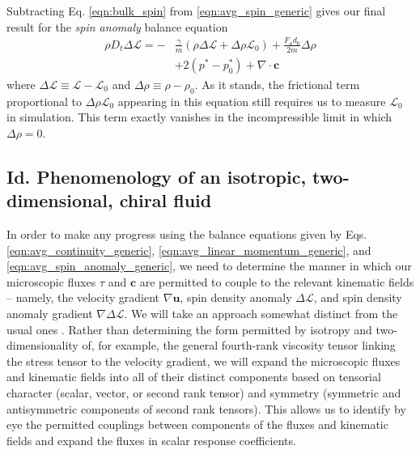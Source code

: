 \documentclass[%
 reprint,
superscriptaddress,
longbibliography,
 amsmath,amssymb,
 prl,
 citeautoscript,
]{revtex4-1}
\begin{document}
Subtracting Eq. \ref{eqn:bulk_spin} from \ref{eqn:avg_spin_generic} gives our final result for the {\it spin anomaly} balance equation
\begin{equation}
\begin{split}
\rho D_t \Delta \mathcal{L} = - &\frac{\gamma}{m} \left( \rho \Delta \mathcal{L} + \Delta \rho \mathcal{L}_0 \right) + \frac{F_a d_0}{2 m} \Delta \rho \\
&+ 2 \left( p^* - p^*_0 \right) + \nabla \cdot {\boldsymbol c}
\end{split}
\label{eqn:avg_spin_anomaly_generic}
\end{equation}
where $\Delta \mathcal{L} \equiv \mathcal{L} - \mathcal{L}_0$ and $\Delta \rho \equiv \rho - \rho_0$. As it stands, the frictional term proportional to $\Delta \rho \mathcal{L}_0$ appearing in this equation still requires us to measure $\mathcal{L}_0$ in simulation. This term exactly vanishes in the incompressible limit in which $\Delta \rho = 0$.

\subsection{Id. Phenomenology of an isotropic, two-dimensional, chiral fluid}

In order to make any progress using the balance equations given by Eqs. \ref{eqn:avg_continuity_generic}, \ref{eqn:avg_linear_momentum_generic}, and \ref{eqn:avg_spin_anomaly_generic}, we need to determine the manner in which our microscopic fluxes $\tau$ and ${\boldsymbol c}$ are permitted to couple to the relevant kinematic fields --  namely, the velocity gradient $\nabla {\boldsymbol u}$, spin density anomaly $\Delta \mathcal{L}$, and spin density anomaly gradient $\nabla \Delta \mathcal{L}$. We will take an approach somewhat distinct from the usual ones \cite{Avron, Kranthi1, Banerjee, free_surface, waves_Kranthi}. Rather than determining the form permitted by isotropy and two-dimensionality of, for example, the general fourth-rank viscosity tensor linking the stress tensor to the velocity gradient, we will expand the microscopic fluxes and kinematic fields into all of their distinct components based on tensorial character (scalar, vector, or second rank tensor) and symmetry (symmetric and antisymmetric components of second rank tensors). This allows us to identify by eye the permitted couplings between components of the fluxes and kinematic fields and expand the fluxes in scalar response coefficients.
\end{document}
